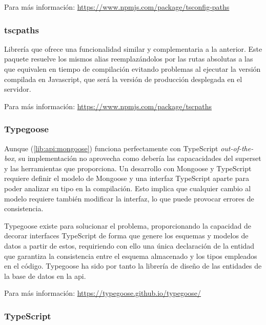 Para más información: \href{https://www.npmjs.com/package/tsconfig-paths}{https://www.npmjs.com/package/tsconfig-paths}

\subsubsection{tscpaths}
\label{lib:api:tscpaths}

Librería que ofrece una funcionalidad similar y complementaria a la anterior. Este paquete resuelve los mismos alias reemplazándolos por las rutas absolutas a las que equivalen en tiempo de compilación evitando problemas al ejecutar la versión compilada en Javascript, que será la versión de producción desplegada en el servidor.

Para más información: \href{https://www.npmjs.com/package/tscpaths}{https://www.npmjs.com/package/tscpaths}

\subsubsection{Typegoose}
\label{lib:api:typegoose}

Aunque  (\ref{lib:api:mongoose}) funciona perfectamente con TypeScript \emph{out-of-the-box}, su implementación no aprovecha como debería las capacacidades del superset y las herramientas que proporciona. Un desarrollo con Mongoose y TypeScript requiere definir el modelo de Mongoose y una interfaz TypeScript aparte para poder analizar su tipo en la compilación. Esto implica que cualquier cambio al modelo requiere también modificar la interfaz, lo que puede provocar errores de consistencia.

Typegoose existe para solucionar el problema, proporcionando la capacidad de decorar interfaces TypeScript de forma que genere los esquemas y modelos de datos a partir de estos, requiriendo con ello una única declaración de la entidad que garantiza la consistencia entre el esquema almacenado y los tipos empleados en el código. Typegoose ha sido por tanto la librería de diseño de las entidades de la base de datos en la \acrshort{api}.

Para más información: \href{https://typegoose.github.io/typegoose/}{https://typegoose.github.io/typegoose/}

\subsubsection{TypeScript}
\label{lib:api:typescript}

